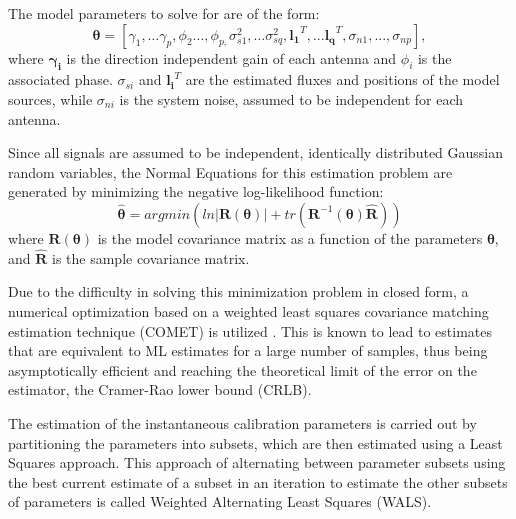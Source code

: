 \documentclass{aa}
\begin{document}
The model parameters to solve for are of the form:
\begin{equation}
\bm{\theta}=[\gamma_{1},\ldots\gamma_{p},\phi_{2}...,\phi_{p,}\sigma_{s1}^{2},...\sigma_{sq}^{2},\mathbf{l_{1}}^{T},...\mathbf{l_{q}}^{T},\sigma_{n1},...,\sigma_{np}],\label{eq:estparam}
\end{equation}
 where $\mathbf{\gamma_{i}}$  is the direction independent gain  of each antenna
 and $\phi_{i}$ is the  associated phase. $\sigma_{si}$ and $\mathbf{l_i}^{T}$ are
 the estimated fluxes and positions of the model sources, while $\sigma_{ni}$ is
 the system noise, assumed to be independent for each antenna.

Since  all  signals  are  assumed  to be  independent,  identically  distributed
Gaussian random variables, the Normal  Equations for this estimation problem are
generated by minimizing the negative log-likelihood function:
\begin{equation}
\bm{\hat{\theta}}=argmin\left(ln|\bm{R(\theta)}|+tr(\mathbf{R}^{-1}(\bm{\theta})\mathbf{\widehat{R}})\right)\label{eq:normeq}
\end{equation}
 where  $\bm{R(\theta)}$  is  the  model  covariance  matrix  as  a
 function of  the parameters $\bm{\theta}$,  and $\mathbf{\widehat{R}}$ is
 the sample covariance matrix.

Due to  the difficulty in  solving this minimization  problem in closed  form, a
numerical  optimization based on  a weighted  least squares  covariance matching
estimation technique (COMET)  is utilized \citep{ottersten1998covariance}.  This
is known to  lead to estimates that  are equivalent to ML estimates  for a large
number  of  samples,  thus  being  asymptotically  efficient  and  reaching  the
theoretical  limit of the  error on  the estimator,  the Cramer-Rao  lower bound
(CRLB).

The estimation  of the  instantaneous calibration parameters  is carried  out by
partitioning the parameters into subsets, which are then estimated using a Least
Squares approach.  This approach  of alternating between parameter subsets using
the best  current estimate  of a subset  in an  iteration to estimate  the other
subsets of parameters is called Weighted Alternating Least Squares (WALS).
\end{document}
